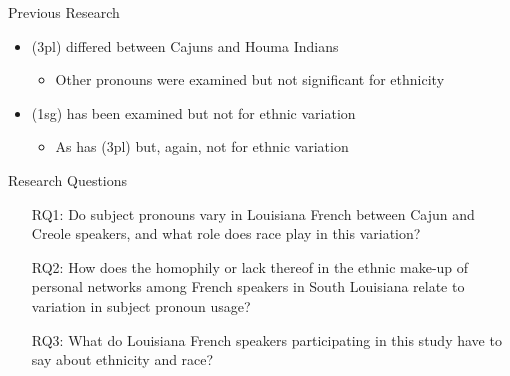 \documentclass{beamer}\usepackage[]{graphicx}\usepackage[]{xcolor}
\begin{document}
    \begin{frame}{Previous Research}
      \begin{itemize}
        \item (3pl) differed between Cajuns and Houma Indians \parencite{rottet_language_1995, dajko_ethnic_2009}
        \begin{itemize}
          \item Other pronouns were examined but not significant for ethnicity
        \end{itemize}
        \item (1sg) has been examined but not for ethnic variation \parencite{carmichael_language_2019, gudmestad_variationist_2022, klingler_probleme_2005}
        \begin{itemize}
          \item As has (3pl) but, again, not for ethnic variation \parencite{byers_defining_1988, klingler_if_2003, neumann_creole_1985}
        \end{itemize}
      \end{itemize}
    \end{frame}

    \begin{frame}{Research Questions}
      \begin{itemize}
        \item[RQ1:] Do subject pronouns vary in Louisiana French between Cajun and Creole speakers, and what role does race play in this variation?
        \item[RQ2:] How does the homophily or lack thereof in the ethnic make-up of personal networks among French speakers in South Louisiana relate to variation in subject pronoun usage?
        \item[RQ3:] What do Louisiana French speakers participating in this study have to say about ethnicity and race?
      \end{itemize}
    \end{frame}
\end{document}
